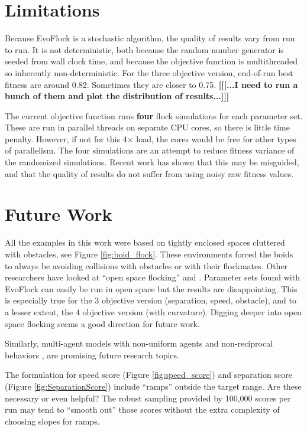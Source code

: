 \documentclass[letterpaper]{article}
\begin{document}
\section{Limitations}
\label{sec:limitations}

Because EvoFlock is a stochastic algorithm, the quality of results vary from run to run. It is not deterministic, both because the random number generator is seeded from wall clock time, and because the objective function is multithreaded so inherently non-deterministic. For the three objective version, end-of-run best fitness are around 0.82. Sometimes they are closer to 0.75. \textbf{[[[...I need to run a bunch of them and plot the distribution of results...]]]}

The current objective function runs \textbf{four} flock simulations for each parameter set. These are run in parallel threads on separate CPU cores, so there is little time penalty. However, if not for this 4{$\times$} load, the cores would be free for other types of parallelism. The four simulations are an attempt to reduce fitness variance of the randomized simulations. Recent work \citep{antipov_evolutionary_2025} has shown that this may be misguided, and that the quality of results do not suffer from using noisy raw fitness values.

\section{Future Work}
\label{sec:future}

All the examples in this work were based on tightly enclosed spaces cluttered with obstacles, see Figure \ref{fig:boid_flock}. These environments forced the boids to always be avoiding collisions with obstacles or with their flockmates. Other researchers have looked at ``open space flocking'' \citep{hoetzlein_flock2_2024} and \citep{brambati_learning_2025}. Parameter sets found with EvoFlock can easily be run in open space but the results are disappointing. This is especially true for the 3 objective version (separation, speed, obstacle), and to a lesser extent, the 4 objective version (with curvature). Digging deeper into open space flocking seems a good direction for future work.

Similarly, multi-agent models with non-uniform agents \citep{montanari_optimal_2025} and non-reciprocal behaviors \citep{choi_flocking_2025}, \citep{weis_generalized_2025} are promising future research topics.

The formulation for speed score (Figure \ref{fig:speed_score}) and separation score (Figure \ref{fig:SeparationScore}) include ``ramps'' outside the target range. Are these necessary or even helpful? The robust sampling provided by 100,000 scores per run may tend to ``smooth out'' those scores without the extra complexity of choosing slopes for ramps.
\end{document}
